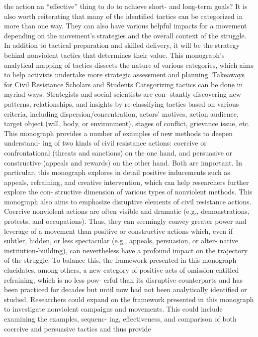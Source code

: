 \documentclass[twoside,a4paper,12pt,fleqn,openany]{extbook}
\begin{document}
the action an “effective” thing to do to achieve short- and long-term goals?
It is also worth reiterating that many of the identified tactics can be categorized in more
than one way. They can also have various helpful impacts for a movement depending on the
movement’s strategies and the overall context of the struggle. In addition to tactical preparation
and skilled delivery, it will be the strategy behind nonviolent tactics that determines their value.
This monograph’s analytical mapping of tactics dissects the nature of various categories, which
aims to help activists undertake more strategic assessment and planning.
Takeaways for Civil Resistance Scholars and Students
Categorizing tactics can be done in myriad ways. Strategists and social scientists are con-
stantly discovering new patterns, relationships, and insights by re-classifying tactics based
on various criteria, including dispersion/concentration, actors’ motives, action audience, target
object (will, body, or environment), stages of conflict, grievance issue, etc.
This monograph provides a number of examples of new methods to deepen understand-
ing of two kinds of civil resistance actions: coercive or confrontational (threats and sanctions)
on the one hand, and persuasive or constructive (appeals and rewards) on the other hand.
Both are important.
In particular, this monograph explores in detail positive inducements such as appeals,
refraining, and creative intervention, which can help researchers further explore the con-
structive dimension of various types of nonviolent methods. This monograph also aims to
emphasize disruptive elements of civil resistance actions. Coercive nonviolent actions are
often visible and dramatic (e.g., demonstrations, protests, and occupations). Thus, they can
seemingly convey greater power and leverage of a movement than positive or constructive
actions which, even if subtler, hidden, or less spectacular (e.g., appeals, persuasion, or alter-
native institution-building), can nevertheless have a profound impact on the trajectory of the
struggle. To balance this, the framework presented in this monograph elucidates, among
others, a new category of positive acts of omission entitled refraining, which is no less pow-
erful than its disruptive counterparts and has been practiced for decades but until now had
not been analytically identified or studied.
Researchers could expand on the framework presented in this monograph to investigate
nonviolent campaigns and movements. This could include examining the examples, sequenc-
ing, effectiveness, and comparison of both coercive and persuasive tactics and thus provide
\end{document}

